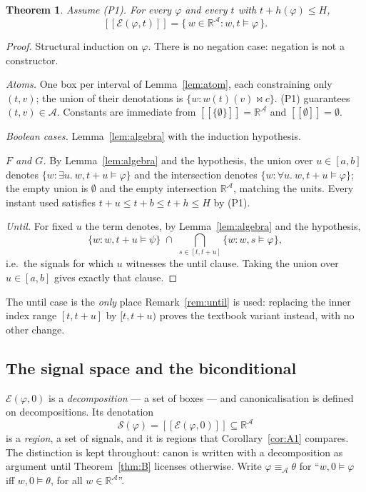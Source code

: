 \documentclass[11pt,a4paper]{article}
\theoremstyle{plain}
\newtheorem{theorem}{Theorem}
\theoremstyle{definition}
\theoremstyle{remark}
\newcommand{\R}{\mathbb{R}}
\newcommand{\sem}[1]{[\![#1]\!]}
\newcommand{\can}{\mathrm{canon}}
\newcommand{\Sig}{\mathcal{S}}
\newcommand{\Ax}{\mathcal{A}}
\begin{document}
\begin{theorem}\label{thm:A}
Assume \textup{(P1)}. For every $\varphi$ and every $t$ with $t + h(\varphi) \le H$,
\[
  \sem{\mathcal{E}(\varphi, t)} = \{\, w \in \R^{\Ax} : w,t \models \varphi \,\}.
\]
\end{theorem}

\begin{proof}
Structural induction on $\varphi$. There is no negation case: negation is not a
constructor.

\emph{Atoms.} One box per interval of Lemma~\ref{lem:atom}, each constraining
only $(t,v)$; the union of their denotations is $\{w : w(t)(v) \bowtie c\}$.
(P1) guarantees $(t,v) \in \Ax$. Constants are immediate from
$\sem{\{\emptyset\}} = \R^{\Ax}$ and $\sem{\emptyset} = \emptyset$.

\emph{Boolean cases.} Lemma~\ref{lem:algebra} with the induction hypothesis.

\emph{$F$ and $G$.} By Lemma~\ref{lem:algebra} and the hypothesis, the union
over $u \in [a,b]$ denotes $\{w : \exists u.\ w,t{+}u \models \varphi\}$ and the
intersection denotes $\{w : \forall u.\ w,t{+}u \models \varphi\}$; the empty
union is $\emptyset$ and the empty intersection $\R^{\Ax}$, matching the units.
Every instant used satisfies $t{+}u \le t + b \le t + h \le H$ by (P1).

\emph{Until.} For fixed $u$ the term denotes, by Lemma~\ref{lem:algebra} and the
hypothesis,
\[
  \{w : w,t{+}u \models \psi\} \;\cap\; \bigcap_{s \in [t,t+u]} \{w : w,s \models \varphi\},
\]
i.e.\ the signals for which $u$ witnesses the until clause. Taking the union
over $u \in [a,b]$ gives exactly that clause.
\end{proof}

The until case is the \emph{only} place Remark~\ref{rem:until} is used:
replacing the inner index range $[t, t{+}u]$ by $[t, t{+}u)$ proves the textbook
variant instead, with no other change.

\subsection{The signal space and the biconditional}

$\mathcal{E}(\varphi,0)$ is a \emph{decomposition} --- a set of boxes --- and
canonicalisation is defined on decompositions. Its denotation
\[
  \Sig(\varphi) = \sem{\mathcal{E}(\varphi, 0)} \subseteq \R^{\Ax}
\]
is a \emph{region}, a set of signals, and it is regions that
Corollary~\ref{cor:A1} compares. The distinction is kept throughout: $\can$ is
written with a decomposition as argument until Theorem~\ref{thm:B} licenses
otherwise. Write $\varphi \equiv_{\Ax} \theta$ for ``$w,0 \models \varphi$ iff
$w,0 \models \theta$, for all $w \in \R^{\Ax}$''.
\end{document}
